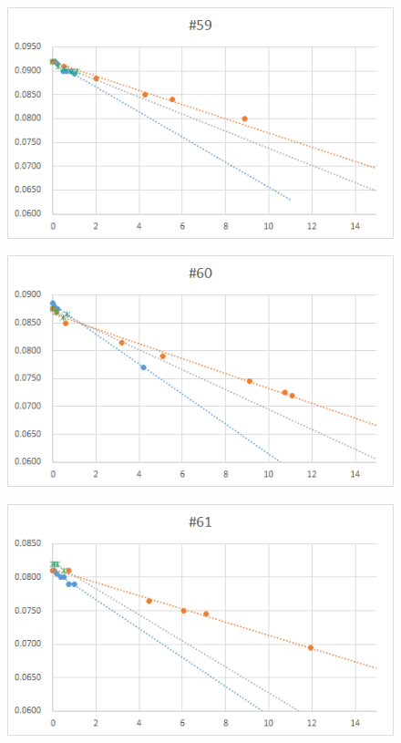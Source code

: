 \documentclass[12pt,a4paper]{jarticle}
\begin{document}
\begin{figure}[htbp]
  \centering
     \includegraphics[width=120mm]{vol_059.png}
\end{figure}
\begin{figure}[htbp]
  \centering
     \includegraphics[width=120mm]{vol_060.png}
\end{figure}
\begin{figure}[htbp]
  \centering
     \includegraphics[width=120mm]{vol_061.png}
\end{figure}
\end{document}
